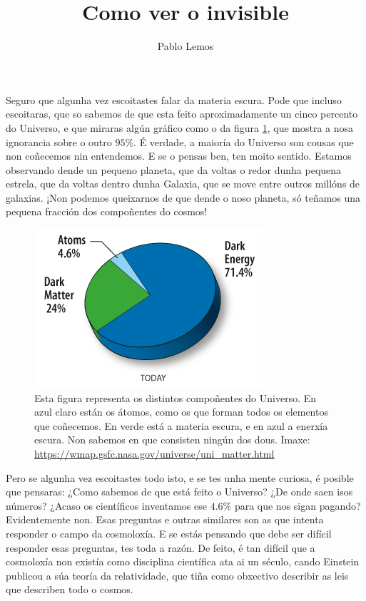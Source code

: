 \documentclass{article}
\title{Como ver o invisible}
\author{Pablo Lemos}
\begin{document}
\maketitle

Seguro que algunha vez escoitastes falar da materia escura. Pode que incluso escoitaras, 
que so sabemos de que esta feito aproximadamente un cinco percento do Universo, e 
que miraras algún gráfico como o da figura \ref{fig:piechart}, que mostra a nosa 
ignorancia sobre o outro $95 \%$. É verdade, a maioría do Universo son cousas que non 
coñecemos nin entendemos. E se o pensas ben, ten moito sentido. Estamos observando dende 
un pequeno planeta, que da voltas o redor dunha pequena estrela, que da voltas dentro 
dunha Galaxia, que se move entre outros millóns de galaxias. ¡Non podemos queixarnos de 
que dende o noso planeta, só teñamos una pequena fracción dos compoñentes do cosmos!

\begin{figure}[h]
\includegraphics{piechart.pdf}
\caption{Esta figura representa os distintos compoñentes do Universo. En azul claro están 
os átomos, como os que forman todos os elementos que coñecemos. En verde está a materia 
escura, e en azul a enerxía escura. Non sabemos en que consisten ningún dos dous. 
Imaxe: \url{https://wmap.gsfc.nasa.gov/universe/uni_matter.html}
\label{fig:piechart}
}
\end{figure}


Pero se algunha vez escoitastes todo isto, e se tes unha mente curiosa, é posible que 
pensaras: ¿Como sabemos de que está feito o Universo? ¿De onde saen isos números? 
¿Acaso os científicos inventamos ese $4.6 \%$ para que nos sigan pagando? Evidentemente non. 
Esas preguntas e outras similares son as que intenta responder o campo da cosmoloxía. 
E se estás pensando que debe ser difícil responder esas preguntas, tes toda a razón. 
De feito, é tan difícil que a cosmoloxía non existía como disciplina científica ata ai un 
século, cando Einstein publicou a súa teoría da relatividade, que tiña como obxectivo describir 
as leis que describen todo o cosmos. 
\end{document}

